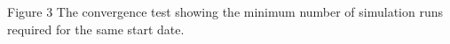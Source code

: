 Figure 3  The convergence test showing the minimum number of simulation runs required for the same start date.